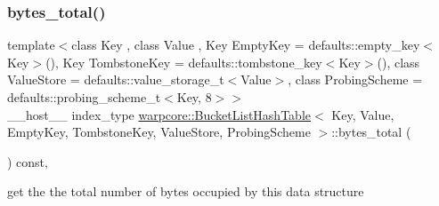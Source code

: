 \subsubsection{\texorpdfstring{bytes\+\_\+total()}{bytes\_total()}}
{\footnotesize\ttfamily template$<$class Key , class Value , Key Empty\+Key = defaults\+::empty\+\_\+key$<$\+Key$>$(), Key Tombstone\+Key = defaults\+::tombstone\+\_\+key$<$\+Key$>$(), class Value\+Store  = defaults\+::value\+\_\+storage\+\_\+t$<$\+Value$>$, class Probing\+Scheme  = defaults\+::probing\+\_\+scheme\+\_\+t$<$\+Key, 8$>$$>$ \\
\+\_\+\+\_\+host\+\_\+\+\_\+ index\+\_\+type \hyperlink{classwarpcore_1_1BucketListHashTable}{warpcore\+::\+Bucket\+List\+Hash\+Table}$<$ Key, Value, Empty\+Key, Tombstone\+Key, Value\+Store, Probing\+Scheme $>$\+::bytes\+\_\+total (\begin{DoxyParamCaption}{ }\end{DoxyParamCaption}) const\hspace{0.3cm}{\ttfamily [inline]}, {\ttfamily [noexcept]}}



get the the total number of bytes occupied by this data structure 

